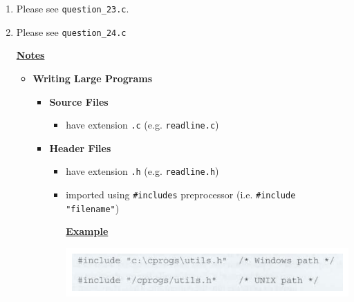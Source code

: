 \documentclass[12pt]{article}
\begin{document}
\begin{enumerate}[1.]
    \item

    \bigskip

    Please see \texttt{question\_23.c}.

    \item

    \bigskip

    Please see \texttt{question\_24.c}

    \bigskip

    \underline{\textbf{Notes}}

    \begin{itemize}
        \item \textbf{Writing Large Programs}

        \begin{itemize}
            \item \textbf{Source Files}

            \begin{itemize}
                \item have extension \texttt{.c} (e.g. \texttt{readline.c})
            \end{itemize}

            \item \textbf{Header Files}

            \begin{itemize}
                \item have extension \texttt{.h} (e.g. \texttt{readline.h})
                \item imported using \texttt{\#includes} preprocessor (i.e. \texttt{\#include "filename"})

                \bigskip

                \underline{\textbf{Example}}

                \bigskip

                \begin{center}
                \includegraphics[width=\linewidth]{images/review_7_solution_15.png}
                \end{center}
            \end{itemize}


\end{itemize}
\end{itemize}
\end{enumerate}
\end{document}
